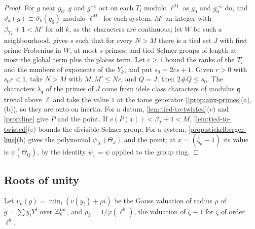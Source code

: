 \begin{proof}
For $g$ near $g_0$, $g$ and $g^{-c}$ act on each $T_i$ modulo $\ell^M$ as $g_0$ and $g_0^{-c}$ do, and $\vartheta_k(g)\equiv\vartheta_k(g_0)$ modulo $\ell^{M'}$ for each system, $M'$ an integer with $\beta_{Y_k}+1<M'$ for all $k$, as the characters are continuous; let $W$ be such a neighbourhood.  gives $s$ such that for every $N>M$ there is a
tied set $J$ with first prime Frobenius in $W$, at most $s$ primes, and tied Selmer groups of length at most the global term plus the places term. Let $c\ge1$ bound the ranks of the $T_i$ and the numbers of exponents of the $Y_k$, and put $s_0=2cs+1$. Given $r>0$ with $s_0r<1$, take $N>M$ with $M,M'\le Nr$, and $Q=J$; then $2\#Q\le s_0$.
The characters $\lambda_{\mathfrak q}$ of the primes of $J$ come from idele class characters of modulus $\mathfrak q$ trivial above $\ell$ and take the value $1$ at the tame generator (\cref{prop:aux-primes}(a), (b)), so they are onto on inertia. For a datum, \cref{lem:tied-to-twisted}(c) and \cref{prop:line} give $P$ and the point.
If $v(P(x))<\beta_T+1<M$, \cref{lem:tied-to-twisted}(e) bounds the divisible Selmer group. For a system, \cref{prop:stickelberger-line}(b) gives the polynomial $\psi_X(\Theta_J)$ and the point; at $x=(\zeta_{\mathfrak q}-1)$ its value is $\psi(\Theta_Q)$, by the identity $\psi_x=\psi$ applied to the group ring.
\end{proof}

\subsection{Roots of unity}\label{ss:roots-unity}
Let $v_\rho(g)=\min_i(v(y_i)+\rho i)$ be the Gauss valuation of radius $\rho$ of $g=\sum y_iY^i$ over $\mathbb{Z}_\ell^{\rm int}$, and $\rho_h=1/\varphi(\ell^h)$, the valuation of $\zeta-1$ for $\zeta$ of order $\ell^h$.

